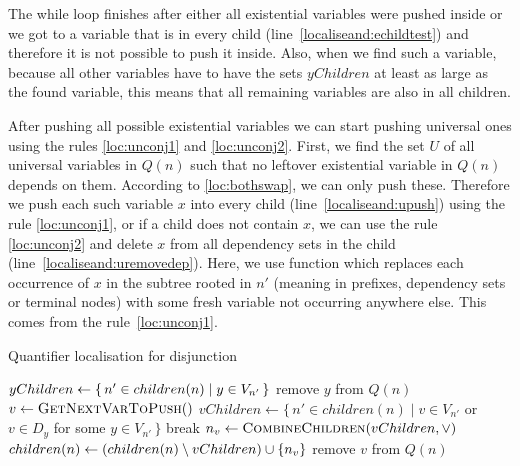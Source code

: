 \documentclass[
  digital, %
  color,
  twoside, %
  table,   %
  nolof,     %
  nolot,     %
]{fithesis3}
\let\setbuilder\set
\newcommand{\simpleset}[1]{\{{#1}\}}
\renewcommand{\set}[1]{\normalexpandarg\IfSubStr{#1}{|}{\setbuilder{#1}}{\simpleset{#1}}}
\theoremstyle{definition}
\theoremstyle{remark}
\newcommand{\vars}[1]{V_{#1}}
\newcommand{\prefix}[1]{Q({#1})}
\newcommand{\eprefix}[1]{Q_{\exists}(#1)}
\newcommand{\children}[1]{children({#1})}
\begin{document}
The while loop finishes after either all existential variables were pushed inside or we got to a variable that is in every child (line~\ref{localiseand:echildtest}) and therefore it is not possible to push it inside. Also, when we find such a variable, because all other variables have to have the sets $yChildren$ at least as large as the found variable, this means that all remaining variables are also in all children.

After pushing all possible existential variables we can start pushing universal ones using the rules \eqref{loc:unconj1} and \eqref{loc:unconj2}. First, we find the set $U$ of all universal variables in $\prefix{n}$ such that no leftover existential variable in $\prefix{n}$ depends on them. According to \eqref{loc:bothswap}, we can only push these. Therefore we push each such variable $x$ into every child (line~\ref{localiseand:upush}) using the rule \eqref{loc:unconj1}, or if a child does not contain $x$, we can use the rule \eqref{loc:unconj2} and delete $x$ from all dependency sets in the child (line~\ref{localiseand:uremovedep}). Here, we use function  which replaces each occurrence of $x$ in the subtree rooted in $n'$ (meaning in prefixes, dependency sets or terminal nodes) with some fresh variable not occurring anywhere else. This comes from the rule~\eqref{loc:unconj1}.

\begin{algorithm}[t!]
  \caption{Quantifier localisation for disjunction}
  \label{alg:localiseor}
  \begin{algorithmic}[1]
      \ForAll{$y \in \eprefix{n}$}\label{localiseor:estart}
        \State $yChildren \gets \set{n' \in \children{n} | y \in \vars{n'}}$\label{localiseor:egetchildren}
        \label{localiseor:checkconditions}
            \State {}\label{localiseor:epush}
            \State {}\label{localiseor:efreshvar}
          \EndFor
          \State remove $y$ from $\prefix{n}$
        \EndIf
      \EndFor\label{localiseor:eend}
      \While{$\prefix{n}$ is not empty}\label{localiseor:bstart}
        \State $v \gets \Call{GetNextVarToPush}{\null}$\label{localiseor:getnextvar}
        \State $vChildren \gets \{\,n' \in \children{n} \mid v \in \vars{n'}$  or  $v \in D_y$ for\label{localiseor:bgetchildren}
        \Statex \hspace{9cm} some $y \in \vars{n'}\,\}$
        \If{$vChildren = \children{n}$}\label{localiseor:bcompare}
          \State break
        \Else
          \State $n_v \gets \Call{CombineChildren}{vChildren, {\lor}}$\label{localiseor:bcombine}
          \State $\children{n} \gets (\children{n} \setminus vChildren) \cup \set{n_v}$\label{localiseor:bupdatechildren}
          \State {}\label{localiseor:bpush}
          \State remove $v$ from $\prefix{n}$\label{localiseor:bremove}
        \EndIf
      \EndWhile\label{localiseor:bend}
    \EndFunction
  \end{algorithmic}
\end{algorithm}
\end{document}
